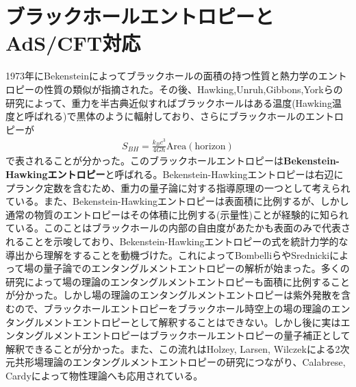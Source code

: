 \section*{ブラックホールエントロピーとAdS/CFT対応}
1973年にBekenstein\cite{Bekenstein:1973ur}によってブラックホールの面積の持つ性質と熱力学のエントロピーの性質の類似が指摘された。その後、Hawking,Unruh,Gibbons,Yorkらの研究\cite{Hawking:1974sw}\cite{Unruh1976}\cite{Bekenstein:1974ax}\cite{Gibbons:1976ue}\cite{York:1986it}によって、重力を半古典近似すればブラックホールはある温度(Hawking温度と呼ばれる)で黒体のように輻射しており、さらにブラックホールのエントロピーが
\begin{align}
S_{BH}=\frac{k_B c^3}{4G \hbar}\text{Area}(\text{horizon})
\end{align}
で表されることが分かった。このブラックホールエントロピーは\textbf{Bekenstein-Hawkingエントロピー}と呼ばれる。Bekenstein-Hawkingエントロピーは右辺にプランク定数を含むため、重力の量子論に対する指導原理の一つとして考えられている。また、Bekenstein-Hawkingエントロピーは表面積に比例するが、しかし通常の物質のエントロピーはその体積に比例する(示量性)ことが経験的に知られている。このことはブラックホールの内部の自由度があたかも表面のみで代表されることを示唆しており、Bekenstein-Hawkingエントロピーの式を統計力学的な導出から理解をすることを動機づけた。これによってBombelliら\cite{Bombelli:1986rw}やSrednicki\cite{Srednicki:1993im}によって場の量子論でのエンタングルメントエントロピーの解析が始まった。多くの研究によって場の理論のエンタングルメントエントロピーも面積に比例することが分かった。しかし場の理論のエンタングルメントエントロピーは紫外発散を含むので、ブラックホールエントロピーをブラックホール時空上の場の理論のエンタングルメントエントロピーとして解釈することはできない。しかし後に実はエンタングルメントエントロピーはブラックホールエントロピーの量子補正として解釈できることが分かった\cite{Solodukhin:2011gn}。また、この流れはHolzey, Larsen, Wilczek\cite{Holzhey_1994}による2次元共形場理論のエンタングルメントエントロピーの研究につながり、Calabrese, Cardy\cite{Calabrese:2004eu}\cite{Calabrese:2005in}によって物性理論へも応用されている。

